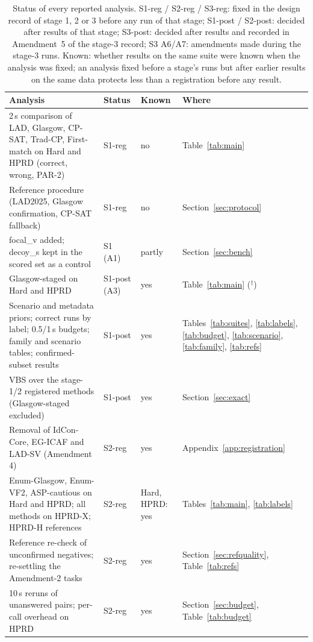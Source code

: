 \begin{table}[t]
\caption{Status of every reported analysis. S1-reg / S2-reg / S3-reg: fixed in the design record of stage 1, 2 or 3 before any run of that stage; S1-post / S2-post: decided after results of that stage; S3-post: decided after results and recorded in Amendment~5 of the stage-3 record; S3 A6/A7: amendments made during the stage-3 runs. Known: whether results on the same suite were known when the analysis was fixed; an analysis fixed before a stage's runs but after earlier results on the same data protects less than a registration before any result.}
\label{tab:registration}
\centering\footnotesize
\begin{tabular}{p{}llp{}}
\toprule
Analysis & Status & Known & Where\\
\midrule
2\,s comparison of LAD, Glasgow, CP-SAT, Trad-CP, First-match on Hard and HPRD (correct, wrong, PAR-2) & S1-reg & no & Table~\ref{tab:main}\\
Reference procedure (LAD2025, Glasgow confirmation, CP-SAT fallback) & S1-reg & no & Section~\ref{sec:protocol}\\
\textsf{focal\_v} added; \textsf{decoy\_s} kept in the scored set as a control & S1 (A1) & partly & Section~\ref{sec:bench}\\
Glasgow-staged on Hard and HPRD & S1-post (A3) & yes & Table~\ref{tab:main} ($^\dagger$)\\
Scenario and metadata priors; correct runs by label; 0.5/1\,s budgets; family and scenario tables; confirmed-subset results & S1-post & yes & Tables~\ref{tab:suites}, \ref{tab:labels}, \ref{tab:budget}, \ref{tab:scenario}, \ref{tab:family}, \ref{tab:refs}\\
VBS over the stage-1/2 registered methods (Glasgow-staged excluded) & S1-post & yes & Section~\ref{sec:exact}\\
Removal of IdCon-Core, EG-ICAF and LAD-SV (Amendment 4) & S2-reg & yes & Appendix~\ref{app:registration}\\
Enum-Glasgow, Enum-VF2, ASP-cautious on Hard and HPRD; all methods on HPRD-X; HPRD-H references & S2-reg & Hard, HPRD: yes & Tables~\ref{tab:main}, \ref{tab:labels}\\
Reference re-check of unconfirmed negatives; re-settling the Amendment-2 tasks & S2-reg & yes & Section~\ref{sec:refquality}, Table~\ref{tab:refs}\\
10\,s reruns of unanswered pairs; per-call overhead on HPRD & S2-reg & yes & Section~\ref{sec:budget}, Table~\ref{tab:budget}\\

\end{tabular}
\end{table}
